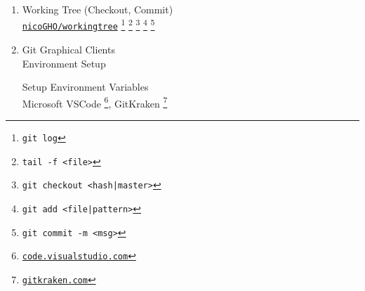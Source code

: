 \documentclass[12pt,a4paper]{article}
\begin{document}
\begin{enumerate}
\begin{tikzpicture}
		\end{tikzpicture}

		
		\vspace{2cm}
		
			
		\textbf{Git} \footnote{\href{https://git-scm.com/}{\texttt{git-scm.com}}} \footnote{Explorer Association, Notepad as Default Editor} \\ \textbf{G}lobal \textbf{I}nformation \textbf{T}racker \\ \textbf{G}oddamn \textbf{I}diotic \textbf{T}ruckload of shit
		
		\vspace{1cm}
		\textbf{Source code} version control - Based on \emph{commits} - Scope: Only text files
		
		\newpage 
		
		\item Working Tree (Checkout, Commit) \\ \href{https://github.com/nicoGHO/workingtree}{\texttt{nicoGHO/workingtree}}
		\footnote{\texttt{git log}}
		\footnote{\texttt{tail -f <file>}}
		\footnote{\texttt{git checkout <hash|master>}}
		\footnote{\texttt{git add <file|pattern>}}
		\footnote{\texttt{git commit -m <msg>}}
		\vspace{1cm}
		
		
		
		\newpage
		\item Git Graphical Clients \\ Environment Setup
	
	
		\vspace{1cm}
		
		Setup Environment Variables \\
		Microsoft VSCode \footnote{\href{https://code.visualstudio.com/}{\texttt{code.visualstudio.com}}}, GitKraken \footnote {\href{https://www.gitkraken.com/}{\texttt{gitkraken.com}}}
		

\end{enumerate}
\end{document}
